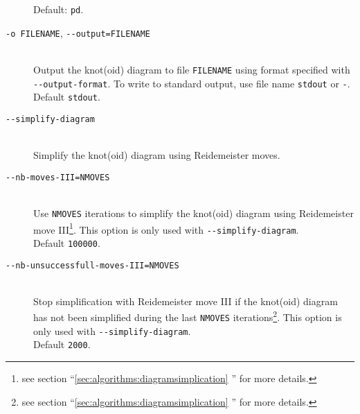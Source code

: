 \begin{description}
  Default: \lstinline{pd}.
\item[\lstinline{-o FILENAME}, \lstinline{--output=FILENAME}]\hfill\\
  Output the knot(oid) diagram to file \lstinline{FILENAME} using format specified with \lstinline{--output-format}.  To write to standard output, use file name \lstinline{stdout} or \lstinline{-}.\\
  Default \lstinline{stdout}.
\item[\lstinline{--simplify-diagram}]\hfill\\
  Simplify the knot(oid) diagram using Reidemeister moves.
\item[\lstinline{--nb-moves-III=NMOVES}]\hfill\\
  Use \lstinline{NMOVES} iterations to simplify the knot(oid) diagram using Reidemeister move III\footnote{see section  ``\ref{sec:algorithms:diagramsimplication} '' for more details.}. This option is only used with \lstinline{--simplify-diagram}.\\
  Default \lstinline{100000}.
\item[\lstinline{--nb-unsuccessfull-moves-III=NMOVES}]\hfill\\
  Stop simplification with Reidemeister move III if the knot(oid) diagram has not been simplified during the last \lstinline{NMOVES} iterations\footnote{see section  ``\ref{sec:algorithms:diagramsimplication} '' for more details.}. This option is only used with \lstinline{--simplify-diagram}.\\
  Default \lstinline{2000}.
\end{description}
